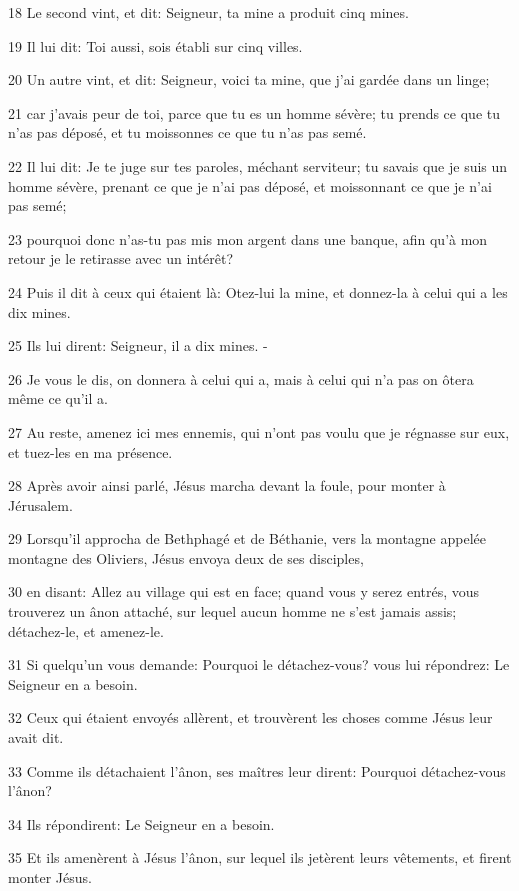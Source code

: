 \par 18 Le second vint, et dit: Seigneur, ta mine a produit cinq mines.
\par 19 Il lui dit: Toi aussi, sois établi sur cinq villes.
\par 20 Un autre vint, et dit: Seigneur, voici ta mine, que j'ai gardée dans un linge;
\par 21 car j'avais peur de toi, parce que tu es un homme sévère; tu prends ce que tu n'as pas déposé, et tu moissonnes ce que tu n'as pas semé.
\par 22 Il lui dit: Je te juge sur tes paroles, méchant serviteur; tu savais que je suis un homme sévère, prenant ce que je n'ai pas déposé, et moissonnant ce que je n'ai pas semé;
\par 23 pourquoi donc n'as-tu pas mis mon argent dans une banque, afin qu'à mon retour je le retirasse avec un intérêt?
\par 24 Puis il dit à ceux qui étaient là: Otez-lui la mine, et donnez-la à celui qui a les dix mines.
\par 25 Ils lui dirent: Seigneur, il a dix mines. -
\par 26 Je vous le dis, on donnera à celui qui a, mais à celui qui n'a pas on ôtera même ce qu'il a.
\par 27 Au reste, amenez ici mes ennemis, qui n'ont pas voulu que je régnasse sur eux, et tuez-les en ma présence.
\par 28 Après avoir ainsi parlé, Jésus marcha devant la foule, pour monter à Jérusalem.
\par 29 Lorsqu'il approcha de Bethphagé et de Béthanie, vers la montagne appelée montagne des Oliviers, Jésus envoya deux de ses disciples,
\par 30 en disant: Allez au village qui est en face; quand vous y serez entrés, vous trouverez un ânon attaché, sur lequel aucun homme ne s'est jamais assis; détachez-le, et amenez-le.
\par 31 Si quelqu'un vous demande: Pourquoi le détachez-vous? vous lui répondrez: Le Seigneur en a besoin.
\par 32 Ceux qui étaient envoyés allèrent, et trouvèrent les choses comme Jésus leur avait dit.
\par 33 Comme ils détachaient l'ânon, ses maîtres leur dirent: Pourquoi détachez-vous l'ânon?
\par 34 Ils répondirent: Le Seigneur en a besoin.
\par 35 Et ils amenèrent à Jésus l'ânon, sur lequel ils jetèrent leurs vêtements, et firent monter Jésus.
